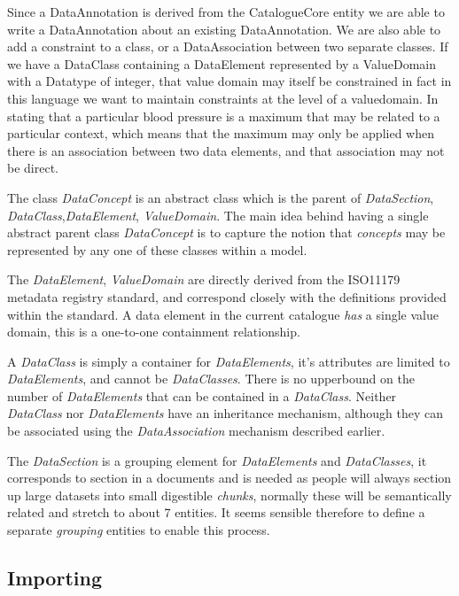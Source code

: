 \documentclass{article}
\begin{document}
Since a DataAnnotation is derived from the CatalogueCore entity we are able to write a DataAnnotation about an existing DataAnnotation. We are also able to add a constraint to a class, or a DataAssociation between two separate classes. If we have a DataClass containing a DataElement represented by a ValueDomain with a Datatype of integer, that value domain may itself be constrained in fact in this language we want to maintain constraints at the level of a valuedomain. In stating that a particular blood pressure is a maximum that may be related to a particular context, which means that the maximum may only be applied when there is an association between two data elements, and that association may not be direct.




The class \emph{DataConcept} is an abstract class which is the parent of \emph{DataSection}, \emph{DataClass},\emph{DataElement}, \emph{ValueDomain}. The main idea behind having a single abstract parent class  \emph{DataConcept}  is to capture the notion that \emph{concepts} may be represented by any one of these classes within a model.  

The \emph{DataElement}, \emph{ValueDomain} are directly derived from the ISO11179 metadata registry standard, and correspond closely with the definitions provided within the standard. A data element in the current catalogue \emph{has} a single value domain, this is a one-to-one containment relationship. 

A \emph{DataClass} is simply a container for \emph{DataElements}, it's attributes are limited to \emph{DataElements}, and cannot be  \emph{DataClasses}. There is no upperbound on the number of \emph{DataElements} that can be contained in a \emph{DataClass}. Neither \emph{DataClass} nor \emph{DataElements} have an inheritance mechanism, although they can be associated using the \emph{DataAssociation} mechanism described earlier.

The \emph{DataSection} is a grouping element for \emph{DataElements} and \emph{DataClasses}, it corresponds to section in a documents and is needed as people will always section up large datasets into small digestible \emph{chunks}, normally these will be semantically related and stretch to about 7 entities. It seems sensible therefore to define a separate \emph{grouping} entities to enable this process. 

\subsection{Importing}
\end{document}
